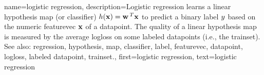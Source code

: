 {name={logistic regression}, 
	description={Logistic \gls{regression} learns a 
		linear \gls{hypothesis} \gls{map} (or \gls{classifier}) $h({\bf x}) = {\bf w}\,^{T} {\bf x}$ 
		to predict a binary \gls{label} $y$ based on the numeric \gls{featurevec} ${\bf x}$ of 
		a \gls{datapoint}. The quality of a linear \gls{hypothesis} \gls{map} is measured by the average \gls{logloss} 
		on some \glspl{labeled datapoint} (i.e., the \gls{trainset}).
				\\
		See also: \gls{regression}, \gls{hypothesis}, \gls{map}, \gls{classifier}, \gls{label}, \gls{featurevec}, \gls{datapoint}, \gls{logloss}, \gls{labeled datapoint}, \gls{trainset}.},
	first={logistic regression},
	text={logistic regression}
}
	

